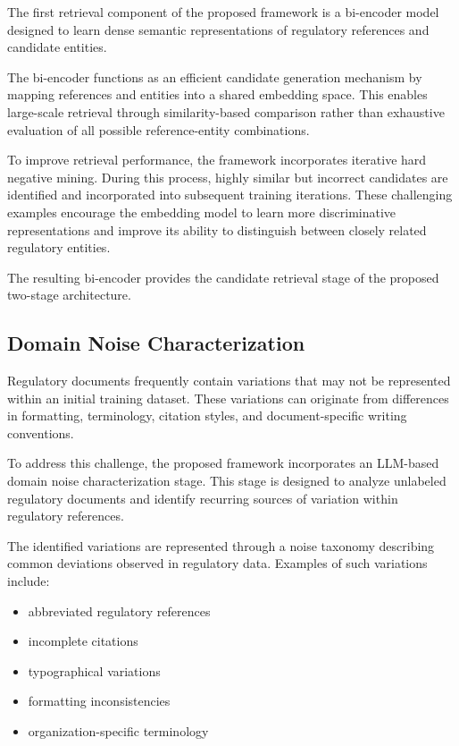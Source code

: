 The first retrieval component of the proposed framework is a bi-encoder model designed to learn dense semantic representations of regulatory references and candidate entities.

The bi-encoder functions as an efficient candidate generation mechanism by mapping references and entities into a shared embedding space. This enables large-scale retrieval through similarity-based comparison rather than exhaustive evaluation of all possible reference-entity combinations.

To improve retrieval performance, the framework incorporates iterative hard negative mining. During this process, highly similar but incorrect candidates are identified and incorporated into subsequent training iterations. These challenging examples encourage the embedding model to learn more discriminative representations and improve its ability to distinguish between closely related regulatory entities.

The resulting bi-encoder provides the candidate retrieval stage of the proposed two-stage architecture.

\subsection{Domain Noise Characterization}

Regulatory documents frequently contain variations that may not be represented within an initial training dataset. These variations can originate from differences in formatting, terminology, citation styles, and document-specific writing conventions.

To address this challenge, the proposed framework incorporates an LLM-based domain noise characterization stage. This stage is designed to analyze unlabeled regulatory documents and identify recurring sources of variation within regulatory references.

The identified variations are represented through a noise taxonomy describing common deviations observed in regulatory data. Examples of such variations include:

\begin{itemize}
    \item abbreviated regulatory references
    \item incomplete citations
    \item typographical variations
    \item formatting inconsistencies
    \item organization-specific terminology
\end{itemize}

